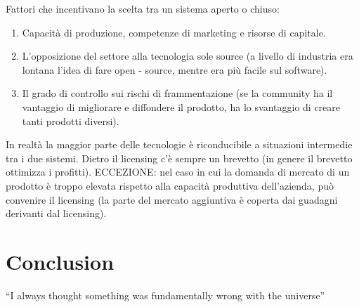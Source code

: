\documentclass{article}
\begin{document}
Fattori che incentivano la scelta tra un sistema aperto o chiuso:
\begin{enumerate}
\item  Capacità di produzione, competenze di marketing e risorse di capitale.
\item  L’opposizione del settore alla tecnologia sole source (a livello di industria era lontana l’idea
di fare open - source, mentre era più facile sul software).
\item Il grado di controllo sui rischi di frammentazione (se la community ha il vantaggio di
migliorare e diffondere il prodotto, ha lo svantaggio di creare tanti prodotti diversi).
\end{enumerate}


In realtà la maggior parte delle tecnologie è riconducibile a situazioni intermedie tra i due sistemi.
Dietro il licensing c’è sempre un brevetto (in genere il brevetto ottimizza i profitti).
ECCEZIONE: nel caso in cui la domanda di mercato di un prodotto è troppo elevata rispetto alla
capacità produttiva dell’azienda, può convenire il licensing (la parte del mercato aggiuntiva è
coperta dai guadagni derivanti dal licensing).



 





\section{Conclusion}
``I always thought something was fundamentally wrong with the universe'' \citep{adams1995hitchhiker}



\end{document}
